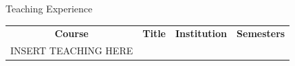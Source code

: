 \documentclass{resume} %
\begin{document}
\newpage
\begin{rSection}{Teaching Experience}

\begin{center}
\begin{tabular}{cLcc}
\textbf{Course} & \textbf{Title} & \textbf{Institution} & \textbf{Semesters}\\
\hline
INSERT TEACHING HERE
\end{tabular}
\end{center}





\end{rSection}


\end{document}
